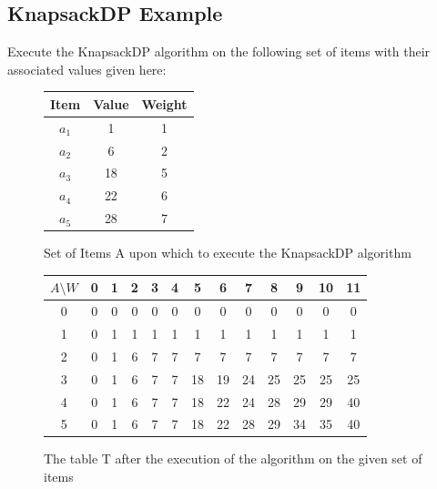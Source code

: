 \documentclass[12pt,letterpaper]{article}
\begin{document}
\subsection{KnapsackDP Example} Execute the KnapsackDP algorithm on the following set of items with their associated values given here:
\begin{figure}[h]
\centering
\begin{tabular}{|c|c|c|}
\hline
Item&Value&Weight\\ \hline \hline
$a_1$& 1 &1\\ \hline
$a_2$&6&2 \\ \hline
$a_3$&18&5\\ \hline
$a_4$&22&6\\ \hline
$a_5$&28&7\\ \hline
\end{tabular}
\caption{Set of Items A upon which to execute the KnapsackDP algorithm}
\end{figure}
\begin{figure}[h]
\centering
\begin{tabular}{|c|c|c|c|c|c|c|c|c|c|c|c|c|}
\hline
$A\setminus W$&0&1&2&3&4&5&6&7&8&9&10&11\\ \hline \hline
0&0&0&0&0&0&0&0&0&0&0&0&0\\ \hline
1&0&1&1&1&1&1&1&1&1&1&1&1\\ \hline
2&0&1&6&7&7&7&7&7&7&7&7&7\\ \hline
3&0&1&6&7&7&18&19&24&25&25&25&25\\ \hline
4&0&1&6&7&7&18&22&24&28&29&29&40\\ \hline
5&0&1&6&7&7&18&22&28&29&34&35&40\\ \hline
\end{tabular}
\caption{The table T after the execution of the algorithm on the given set of items}
\end{figure}
\FloatBarrier
\end{document}
